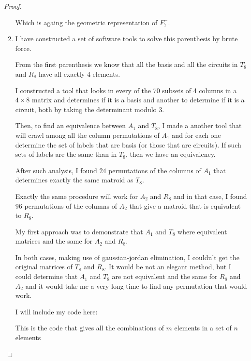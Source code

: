 \begin{proof}
\begin{enumerate}[label=(\roman*)]
            Which is againg the geometric representation of $F_7^-$.
            
        \item
            I have constructed a set of software tools to solve this parenthesis by brute force.\pn
        
            From the first parenthesis we know that all the basis and all the circuits in $T_8$ and $R_8$ have all
            exactly 4 elements.\pn
            
            I constructed a tool that looks in every of the 70 subsets of 4 columns in a $4 \times 8$ matrix and
            determines if it is a basis and another to determine if it is a circuit, both by taking the determinant modulo 3.\pn
            
            Then, to find an equivalence between $A_1$ and $T_8$, I made a another tool that will crawl among all
            the column permutations of $A_1$ and for each one determine the set of labels that are basis (or those that are circuits).\pn
            If such sets of labels are the same than in $T_8$, then we have an equivalency.\pn
            
            After such analysis, I found 24 permutations of the columns of $A_1$ that determines exactly the same matroid as $T_8$.\pn
            
            Exactly the same procedure will work for $A_2$ and $R_8$ and in that case, I found 96 permutations of the columns of $A_2$ that 
            give a matroid that is equivalent to $R_8$.\pn
            
            My first approach was to demonstrate that $A_1$ and $T_8$ where equivalent matrices and the same for $A_2$ and $R_8$.\pn
            
            In both cases, making use of gaussian-jordan elimination, I couldn't get the original matrices of $T_8$ and $R_8$. It
            would be not an elegant method, but I could determine that $A_1$ and $T_8$ are not equivalent and the same for
            $R_8$ and $A_2$ and it would take me a very long time to find any permutation that would work.\pn
            
            I will include my code here:
            
            This is the code that gives all the combinations of $m$ elements in a set of $n$ elements
            \small
                
            \normalsize
            

\end{enumerate}
\end{proof}
